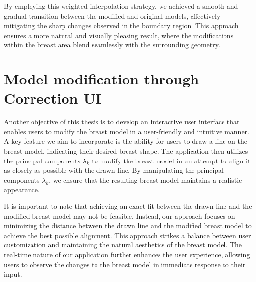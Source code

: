 By employing this weighted interpolation strategy, we achieved a smooth and gradual transition between the modified and original models, effectively mitigating the sharp changes 
observed in the boundary region. This approach ensures a more natural and visually pleasing result, where the modifications within the breast area blend seamlessly with the 
surrounding geometry.

\section{Model modification through Correction UI}\label{sec:correction_ui}

Another objective of this thesis is to develop an interactive user interface that enables users to modify the breast model in a user-friendly and intuitive manner. A key feature we aim to 
incorporate is the ability for users to draw a line on the breast model, indicating their desired breast shape. The application then utilizes the principal components $\lambda_k$ to modify 
the breast model in an attempt to align it as closely as possible with the drawn line. By manipulating the principal components $\lambda_k$, we ensure that the resulting breast model 
maintains a realistic appearance.

It is important to note that achieving an exact fit between the drawn line and the modified breast model may not be feasible. Instead, our approach focuses on minimizing the distance 
between the drawn line and the modified breast model to achieve the best possible alignment. This approach strikes a balance between user customization and maintaining the natural 
aesthetics of the breast model. The real-time nature of our application further enhances the user experience, allowing users to observe the changes to the breast model in immediate 
response to their input.

